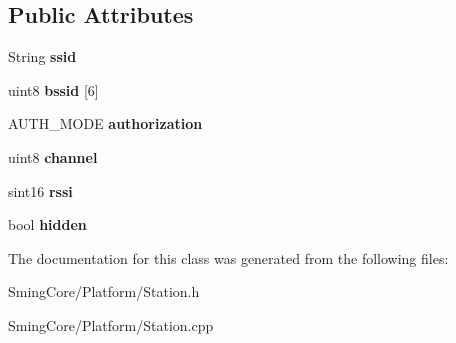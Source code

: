 \subsection*{Public Attributes}
\begin{DoxyCompactItemize}
\item 
\hypertarget{class_bss_info_a60490812f38152aa29babd9d97d4d9cd}{}String {\bfseries ssid}\label{class_bss_info_a60490812f38152aa29babd9d97d4d9cd}

\item 
\hypertarget{class_bss_info_a25ce327fde51018db950ddbba28683d1}{}uint8 {\bfseries bssid} \mbox{[}6\mbox{]}\label{class_bss_info_a25ce327fde51018db950ddbba28683d1}

\item 
\hypertarget{class_bss_info_a3faeffb410dab0b2f36bf18cc7ee2281}{}A\+U\+T\+H\+\_\+\+M\+O\+D\+E {\bfseries authorization}\label{class_bss_info_a3faeffb410dab0b2f36bf18cc7ee2281}

\item 
\hypertarget{class_bss_info_af3c6eddcdc98ec22a49f2a914305cf62}{}uint8 {\bfseries channel}\label{class_bss_info_af3c6eddcdc98ec22a49f2a914305cf62}

\item 
\hypertarget{class_bss_info_a8401f34337a25598bd99257b8664b359}{}sint16 {\bfseries rssi}\label{class_bss_info_a8401f34337a25598bd99257b8664b359}

\item 
\hypertarget{class_bss_info_a14275630c0d4734771122aed1327bb2a}{}bool {\bfseries hidden}\label{class_bss_info_a14275630c0d4734771122aed1327bb2a}

\end{DoxyCompactItemize}


The documentation for this class was generated from the following files\+:\begin{DoxyCompactItemize}
\item 
Sming\+Core/\+Platform/Station.\+h\item 
Sming\+Core/\+Platform/Station.\+cpp\end{DoxyCompactItemize}
